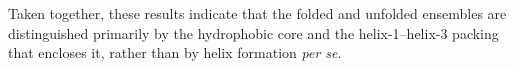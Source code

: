 \documentclass[prl,twocolumn]{revtex4-1}
\begin{document}
Taken together, these results indicate that the folded and unfolded ensembles are distinguished primarily by the hydrophobic core and the helix-1–helix-3 packing that encloses it, rather than by helix formation \textit{per se}.
%
%

\newline
\end{document}

